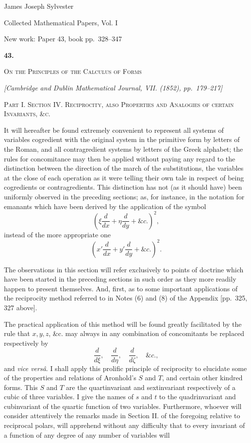 \documentclass[11pt]{article}
\newcommand{\paperhead}[3]{%
  \clearpage
  \begin{center}
  {\Large\bfseries #1.}\par\vspace{0.85em}
  {\large\scshape #2}\par\vspace{0.6em}
  {\itshape [#3]}\par
  \end{center}\vspace{0.4em}}
\newcommand{\subpaperhead}[1]{\begin{center}{\large\scshape #1}\end{center}}
\newcommand{\sourcepage}[1]{\marginpar{\scriptsize p.~#1}}
\begin{document}
\begin{center}
{\Large James Joseph Sylvester}\par\vspace{0.25em}
{\large Collected Mathematical Papers, Vol. I}\par\vspace{0.25em}
{\normalsize New work: Paper 43, book pp.~328--347}\par
\end{center}
\thispagestyle{empty}
\vspace{0.75em}


\paperhead{43}{On the Principles of the Calculus of Forms}{Cambridge and Dublin Mathematical Journal, VII. (1852), pp.~179--217}

\subpaperhead{Part I. \quad Section IV. \quad Reciprocity, also Properties and Analogies of certain Invariants, \&c.}

\sourcepage{328}
It will hereafter be found extremely convenient to represent all systems of variables cogredient with the original system in the primitive form by letters of the Roman, and all contragredient systems by letters of the Greek alphabet; the rules for concomitance may then be applied without paying any regard to the distinction between the direction of the march of the substitutions, the variables at the close of each operation as it were telling their own tale in respect of being cogredients or contragredients. This distinction has not (as it should have) been uniformly observed in the preceding sections; as, for instance, in the notation for emanants which have been derived by the application of the symbol
\[
\left(\xi\frac{d}{dx}+\eta\frac{d}{dy}+\&c.\right)^2,
\]
instead of the more appropriate one
\[
\left(x'\frac{d}{dx}+y'\frac{d}{dy}+\&c.\right)^2.
\]

The observations in this section will refer exclusively to points of doctrine which have been started in the preceding sections in such order as they more readily happen to present themselves. And, first, as to some important applications of the reciprocity method referred to in Notes (6) and (8) of the Appendix [pp.~325, 327 above].

The practical application of this method will be found greatly facilitated by the rule that $x,y,z$, \&c. may always in any combination of concomitants be replaced respectively by
\[
\frac{d}{d\xi},\quad \frac{d}{d\eta},\quad \frac{d}{d\zeta},\quad \&c.,
\]
and \emph{vice versâ}. I shall apply this prolific principle of reciprocity to elucidate some of the properties and relations of Aronhold's $S$ and $T$, and certain other kindred forms. This $S$ and $T$ are the quartinvariant and sextinvariant respectively of a cubic of three variables. I give the names of $s$ and $t$ to the quadrinvariant and cubinvariant of the quartic function of two variables. Furthermore, whoever will consider attentively the remarks made in Section II. of the foregoing relative to reciprocal polars, will apprehend without any difficulty that to every invariant of a function of any degree of any number of variables will
\end{document}
